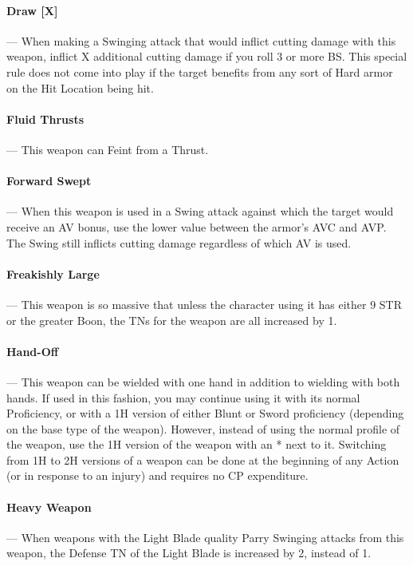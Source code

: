 \documentclass[oneside,11pt,english]{book}
\begin{document}
\paragraph{\label{par:Draw}Draw [X]}---\quad
When making a Swinging attack that would inflict cutting damage with this weapon, inflict X additional cutting damage if you roll 3 or more BS. This special rule does not come into play if the target benefits from any sort of Hard armor on the Hit Location being hit.

\paragraph{\label{par:Fluid Thrusts}Fluid Thrusts}---\quad
This weapon can Feint from a Thrust.

\paragraph{\label{par:Forward Swept}Forward Swept}---\quad
When this weapon is used in a Swing attack against which the target would receive an AV bonus, use the lower value between the armor’s AVC and AVP. The Swing still inflicts cutting damage regardless of which AV is used.

\paragraph{\label{par:Freakishly Large}Freakishly Large}---\quad
This weapon is so massive that unless the character using it has either 9 STR or the greater  Boon, the TNs for the weapon are all increased by 1.

\paragraph{\label{par:Hand-Off}Hand-Off}---\quad
This weapon can be wielded with one hand in addition to wielding with both hands. If used in this fashion, you may continue using it with its normal Proficiency, or with a 1H version of either Blunt or Sword proficiency (depending on the base type of the weapon). However, instead of using the normal profile of the weapon, use the 1H version of the weapon with an * next to it. Switching from 1H to 2H versions of a weapon can be done at the beginning of any Action (or in response to an injury) and requires no CP expenditure.

\paragraph{\label{par:Heavy Weapon}Heavy Weapon}---\quad
When weapons with the Light Blade quality Parry Swinging attacks from this weapon, the Defense TN of the Light Blade is increased by 2, instead of 1.
\end{document}
